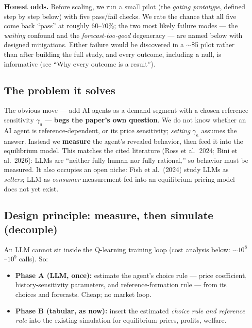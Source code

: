 \documentclass[11pt]{article}
\newcommand{\crit}[1]{\textcolor{crit}{\textbf{#1}}}
\begin{document}
\smallskip
\noindent\textbf{Honest odds.} Before scaling, we run a small pilot (the \emph{gating prototype}, defined
step by step below) with five pass/fail checks. We rate the chance that all five come back ``pass'' at
roughly 60--70\%; the two most likely failure modes --- the \emph{waiting} confound and the
\emph{forecast-too-good} degeneracy --- are named below with designed mitigations. Either failure would be
discovered in a $\sim$\$5 pilot rather than after building the full study, and every outcome, including a
null, is informative (see ``Why every outcome is a result'').

\subsection*{The problem it solves}

The obvious move --- add AI agents as a demand segment with a chosen reference sensitivity $\gamma_a$ ---
\crit{begs the paper's own question}. We do not know whether an AI agent is reference-dependent, or its
price sensitivity; \emph{setting} $\gamma_a$ assumes the answer. Instead we \textbf{measure} the agent's
revealed behavior, then feed it into the equilibrium model. This matches the cited literature (Ross et al.\
2024; Bini et al.\ 2026): LLMs are ``neither fully human nor fully rational,'' so behavior must be measured.
It also occupies an open niche: Fish et al.\ (2024) study LLMs as \emph{sellers}; LLM-as-\emph{consumer}
measurement fed into an equilibrium pricing model does not yet exist.

\subsection*{Design principle: measure, then simulate (decouple)}

An LLM cannot sit inside the Q-learning training loop (cost analysis below: $\sim$$10^8$--$10^9$ calls). So:
\begin{itemize}
  \item \textbf{Phase A (LLM, once):} estimate the agent's choice rule --- price coefficient,
        history-sensitivity parameters, and reference-formation rule --- from its choices and forecasts.
        Cheap; no market loop.
  \item \textbf{Phase B (tabular, as now):} insert the estimated \emph{choice rule and reference rule} into
        the existing simulation for equilibrium prices, profits, welfare.
\end{itemize}
\end{document}
